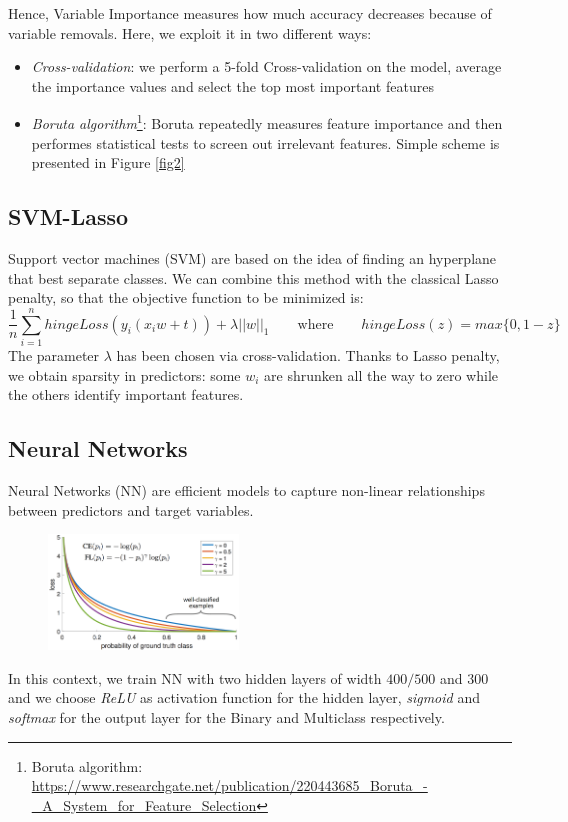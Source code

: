 \documentclass[a4paper,11pt, oneside]{article}  %
\begin{document}
Hence, Variable Importance measures how much accuracy decreases because of variable removals. Here, we exploit it in two different ways:
\begin{itemize}
	\item \textit{Cross-validation}: we perform a 5-fold Cross-validation on the model, average the importance values and select the top most important features
	
\newpage

	\item \textit{Boruta algorithm}\footnote{Boruta algorithm: \url{https://www.researchgate.net/publication/220443685_Boruta_-_A_System_for_Feature_Selection}}: Boruta repeatedly measures feature importance and then performes statistical tests to screen out irrelevant features.  Simple scheme is presented in Figure \ref{fig2}
\end{itemize} 

\subsection{SVM-Lasso}
Support vector machines (SVM) are based on the idea of finding an hyperplane that best separate classes. We can combine this method with the classical Lasso penalty,  so that the objective function to be minimized is:
\begin{equation*}
	\dfrac{1}{n} \sum_{i=1}^n hingeLoss(y_i(x_i w + t)) + \lambda ||w||_1  \qquad	\text{where} \qquad  hingeLoss(z) = max\{0, 1-z\}
\end{equation*}
The parameter $\lambda$ has been chosen via cross-validation. Thanks to Lasso penalty, we obtain sparsity in predictors: some $w_i$ are shrunken all the way to zero while the others identify important features. 

\subsection{Neural Networks}
Neural Networks (NN) are efficient models to capture non-linear relationships between predictors and target variables.

\begin{figure}
	\includegraphics[width=0.45\textwidth]{nn-focal-loss.png}
	\label{fig3}
\end{figure}
In this context, we train NN with two hidden layers of width $400/500$ and $300$ and we choose \textit{ReLU} as activation function for the hidden layer, \textit{sigmoid} and \textit{softmax} for the output layer for the  Binary and Multiclass respectively.
\end{document}
